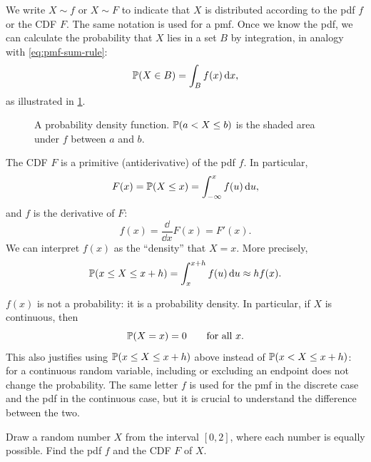 We write $X \sim f$ or $X \sim F$ to indicate that $X$ is distributed according to the pdf $f$ or the CDF $F$. The same notation is used for a pmf. Once we know the pdf, we can calculate the probability that $X$ lies in a set $B$ by integration, in analogy with \eqref{eq:pmf-sum-rule}:
\[
  \mathbb{P}(X \in B) = \int_B f(x) \mathop{}\!\mathrm{d} x,
\]
as illustrated in \cref{fig:pdf-integral-rule}.

\begin{figure}[H]
\centering
{}
\caption{A probability density function. $\mathbb{P}(a < X \le b)$ is the shaded area under $f$ between $a$ and $b$.}
\label{fig:pdf-integral-rule}
\end{figure}

The CDF $F$ is a primitive (antiderivative) of the pdf $f$. In particular,
\[
  F(x) = \mathbb{P}(X \le x) = \int_{-\infty}^x f(u) \mathop{}\!\mathrm{d} u,
\]
and $f$ is the derivative of $F$:
\[
  f(x) = \frac{\dd}{\dd x} F(x) = F'(x).
\]
We can interpret $f(x)$ as the ``density'' that $X = x$. More precisely,
\[
  \mathbb{P}(x \le X \le x + h) = \int_x^{x + h} f(u) \mathop{}\!\mathrm{d} u \approx h f(x).
\]

\begin{remark}\label{rem:density-not-probability}
$f(x)$ is not a probability: it is a probability density. In particular, if $X$ is continuous, then
\[
  \mathbb{P}(X = x) = 0 \qquad \text{for all } x.
\]
This also justifies using $\mathbb{P}(x \le X \le x + h)$ above instead of $\mathbb{P}(x < X \le x + h)$: for a continuous random variable, including or excluding an endpoint does not change the probability. The same letter $f$ is used for the pmf in the discrete case and the pdf in the continuous case, but it is crucial to understand the difference between the two.
\end{remark}

\begin{example}\label{ex:uniform-0-2}
Draw a random number $X$ from the interval $[0, 2]$, where each number is equally possible. Find the pdf $f$ and the CDF $F$ of $X$.
\end{example}

